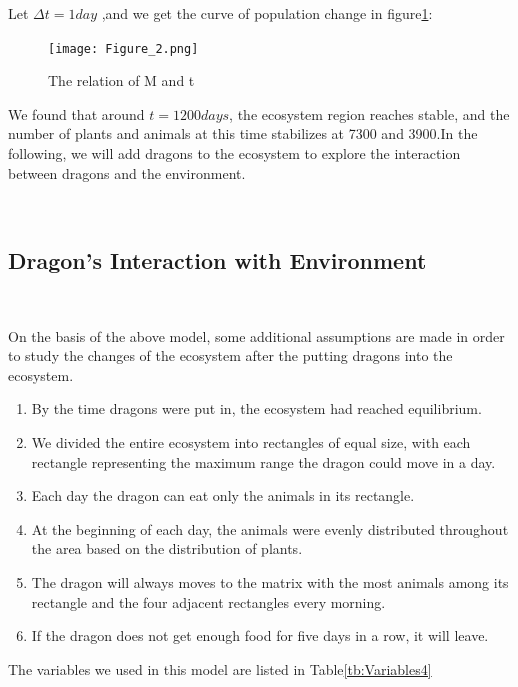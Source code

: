 \documentclass{mcmthesis}
\begin{document}
Let $\Delta t=1day$ ,and we get the curve of population change in figure\ref{Figure_2}:
\begin{figure}[!htbp]
\centering
\texttt{[image: Figure\_2.png]}
\caption{The relation of M and t}\label{Figure_2}
\end{figure}

We found that around $t=1200days$, the ecosystem region reaches stable, and the number of plants and animals at this time stabilizes at 7300 and 3900.In the following, we will add dragons to the ecosystem to explore the interaction between dragons and the environment.

~\ \
\subsection{Dragon's Interaction with Environment}
~\ \

On the basis of the above model, some additional assumptions are made in order to study the changes of the ecosystem after the putting dragons into the ecosystem.
\begin{enumerate}
    \item By the time dragons were put in, the ecosystem had reached equilibrium.
    \item We divided the entire ecosystem into rectangles of equal size, with each rectangle representing the maximum range the dragon could move in a day.
    \item Each day the dragon can eat only the animals in its rectangle.
    \item At the beginning of each day, the animals were evenly distributed throughout the area based on the distribution of plants.
    \item The dragon will always moves to the matrix with the most animals among its rectangle and the four adjacent rectangles every morning.
    \item If the dragon does not get enough food for five days in a row, it will leave.
\end{enumerate}

The variables we used in this model are listed in Table\ref{tb:Variables4}
\end{document}
